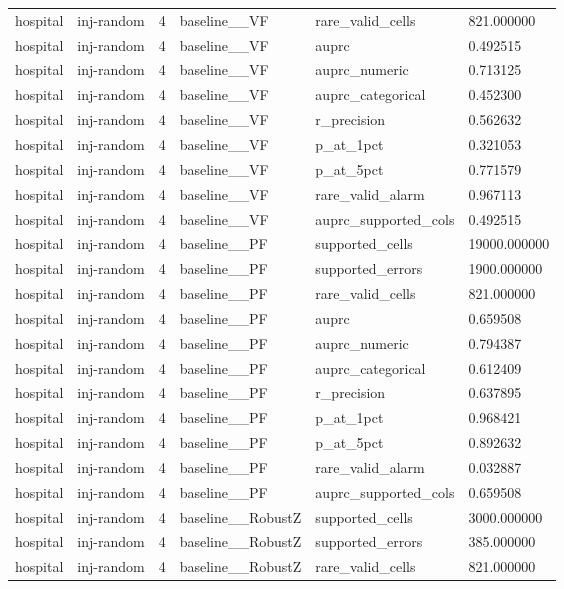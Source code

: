\begin{tabular}{llllll}
hospital & inj-random & 4 & baseline\_\_VF & rare\_valid\_cells & 821.000000 \\
hospital & inj-random & 4 & baseline\_\_VF & auprc & 0.492515 \\
hospital & inj-random & 4 & baseline\_\_VF & auprc\_numeric & 0.713125 \\
hospital & inj-random & 4 & baseline\_\_VF & auprc\_categorical & 0.452300 \\
hospital & inj-random & 4 & baseline\_\_VF & r\_precision & 0.562632 \\
hospital & inj-random & 4 & baseline\_\_VF & p\_at\_1pct & 0.321053 \\
hospital & inj-random & 4 & baseline\_\_VF & p\_at\_5pct & 0.771579 \\
hospital & inj-random & 4 & baseline\_\_VF & rare\_valid\_alarm & 0.967113 \\
hospital & inj-random & 4 & baseline\_\_VF & auprc\_supported\_cols & 0.492515 \\
hospital & inj-random & 4 & baseline\_\_PF & supported\_cells & 19000.000000 \\
hospital & inj-random & 4 & baseline\_\_PF & supported\_errors & 1900.000000 \\
hospital & inj-random & 4 & baseline\_\_PF & rare\_valid\_cells & 821.000000 \\
hospital & inj-random & 4 & baseline\_\_PF & auprc & 0.659508 \\
hospital & inj-random & 4 & baseline\_\_PF & auprc\_numeric & 0.794387 \\
hospital & inj-random & 4 & baseline\_\_PF & auprc\_categorical & 0.612409 \\
hospital & inj-random & 4 & baseline\_\_PF & r\_precision & 0.637895 \\
hospital & inj-random & 4 & baseline\_\_PF & p\_at\_1pct & 0.968421 \\
hospital & inj-random & 4 & baseline\_\_PF & p\_at\_5pct & 0.892632 \\
hospital & inj-random & 4 & baseline\_\_PF & rare\_valid\_alarm & 0.032887 \\
hospital & inj-random & 4 & baseline\_\_PF & auprc\_supported\_cols & 0.659508 \\
hospital & inj-random & 4 & baseline\_\_RobustZ & supported\_cells & 3000.000000 \\
hospital & inj-random & 4 & baseline\_\_RobustZ & supported\_errors & 385.000000 \\
hospital & inj-random & 4 & baseline\_\_RobustZ & rare\_valid\_cells & 821.000000 \\

\end{tabular}
